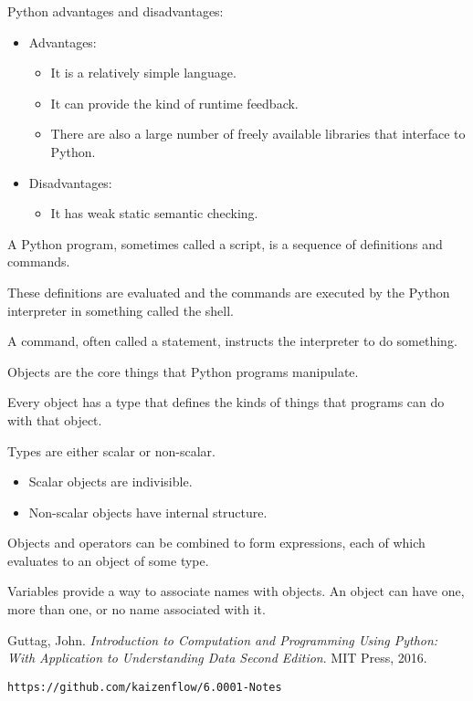 \documentclass[10pt,a5paper]{article}
\begin{document}
Python advantages and disadvantages:
\begin{itemize}
	
	\item Advantages:
	\begin{itemize}
		
		\item  It is a relatively simple language.
		
		\item It can provide the kind of runtime feedback.
		
		\item There are also a large number of freely available libraries that interface to Python.
		
	\end{itemize}
	
	\item Disadvantages:
	\begin{itemize}
	
		\item It has weak static semantic checking.	
	
	\end{itemize}
	
\end{itemize}

A Python program, sometimes called a script, is a sequence of definitions and commands. 

These definitions are evaluated and the commands are executed by the Python interpreter in something called the shell.

A command, often called a statement, instructs the interpreter to do something.

Objects are the core things that Python programs manipulate.

Every object has a type that defines the kinds of things that programs can do with that object.

Types are either scalar or non-scalar.
\begin{itemize}

	\item Scalar objects are indivisible.
	
	\item Non-scalar objects have internal structure. 

\end{itemize}

Objects and operators can be combined to form expressions, each of which evaluates to an object of some type. 

Variables provide a way to associate names with objects. An object can have one, more than one, or no name associated with it.

\begin{thebibliography}{99}

 Guttag, John. \textit{Introduction to Computation and Programming Using Python: With Application to Understanding Data Second Edition}. MIT Press, 2016.

 \texttt{https://github.com/kaizenflow/6.0001-Notes} 

\end{thebibliography}
\end{document}
